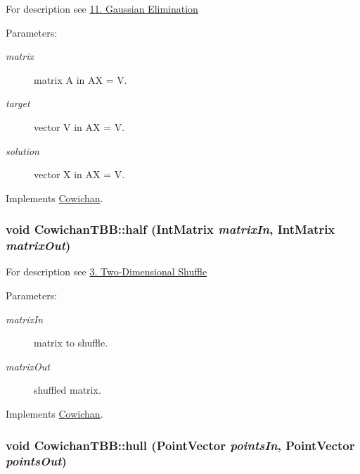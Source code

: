 For description see \hyperlink{index_gauss_sec}{11. Gaussian Elimination} \begin{Desc}
\item[Parameters:]
\begin{description}
\item[{\em matrix}]matrix A in AX = V. \item[{\em target}]vector V in AX = V. \item[{\em solution}]vector X in AX = V. \end{description}
\end{Desc}


Implements \hyperlink{class_cowichan_aa9aac74b96dc5ed33e821d94649d1b2}{Cowichan}.\hypertarget{class_cowichan_t_b_b_bbf17e641657d54fc0c571c008ac8f7a}{
\subsubsection[{half}]{\setlength{\rightskip}{0pt plus 5cm}void CowichanTBB::half ({\bf IntMatrix} {\em matrixIn}, \/  {\bf IntMatrix} {\em matrixOut})}}
\label{class_cowichan_t_b_b_bbf17e641657d54fc0c571c008ac8f7a}


For description see \hyperlink{index_half_sec}{3. Two-Dimensional Shuffle} \begin{Desc}
\item[Parameters:]
\begin{description}
\item[{\em matrixIn}]matrix to shuffle. \item[{\em matrixOut}]shuffled matrix. \end{description}
\end{Desc}


Implements \hyperlink{class_cowichan_308603053675bccbe631f04af921f57c}{Cowichan}.\hypertarget{class_cowichan_t_b_b_0d23aa05dc21fd9e8b033769097b4b18}{
\subsubsection[{hull}]{\setlength{\rightskip}{0pt plus 5cm}void CowichanTBB::hull ({\bf PointVector} {\em pointsIn}, \/  {\bf PointVector} {\em pointsOut})}}
\label{class_cowichan_t_b_b_0d23aa05dc21fd9e8b033769097b4b18}


